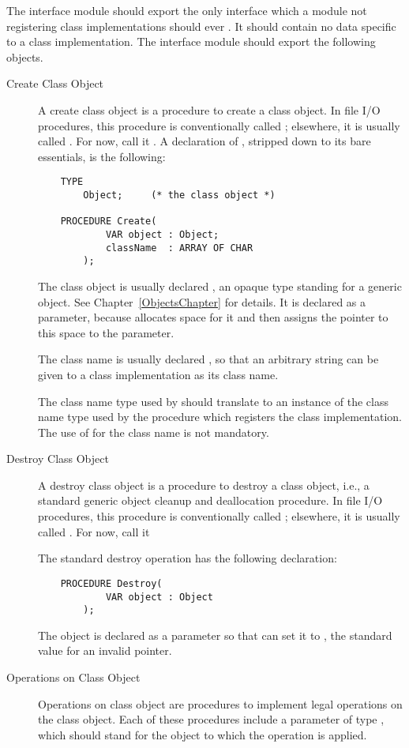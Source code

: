 The interface module should export the only interface which a module not
registering class implementations should ever .
It should contain no data specific to a class implementation.
The interface module should export the following objects.
\begin{description}
\item[Create Class Object]\indent\par
 A create class object is a procedure to create a class object.  In 
 file I/O procedures, this procedure 
 is conventionally called ; elsewhere, it is usually called
 .
 For now, call it .  A declaration of , stripped
 down to its bare essentials, is the following:
\begin{verbatim}
    TYPE
        Object;     (* the class object *)

    PROCEDURE Create(
            VAR object : Object;
            className  : ARRAY OF CHAR 
        );
\end{verbatim}
 
 The class object is usually declared , an opaque type standing
 for a generic object.  See Chapter~\ref{ObjectsChapter} for details.  It 
 is declared
 as a  parameter, because  allocates space for it
 and then assigns the pointer to this space to the parameter.

 The class name is usually declared , so that an arbitrary
 string can be given to a class implementation as its class name.
 
 The class name type used by  should translate
 to an instance of the class name type used by the procedure which registers
 the class implementation.  The use of  for
 the class name is not mandatory.

\item[Destroy Class Object]\indent\par
 A destroy class object is a procedure to destroy a class object, i.e., 
 a standard generic object cleanup
 and deallocation procedure.  In file
 I/O procedures, this procedure is conventionally called ; elsewhere, 
 it is usually called .  For now, call it 

 The standard destroy operation has the following declaration:
\begin{verbatim}
    PROCEDURE Destroy(
            VAR object : Object
        );
\end{verbatim}

The object is declared as a  parameter so that  can
set it to , the standard value for an invalid pointer.

\item[Operations on Class Object]\indent\par
 Operations on class object are procedures to implement legal operations 
 on the class object.  Each of these
 procedures  include a parameter of type , which
 should stand for the object to which the operation is applied.
\end{description}


